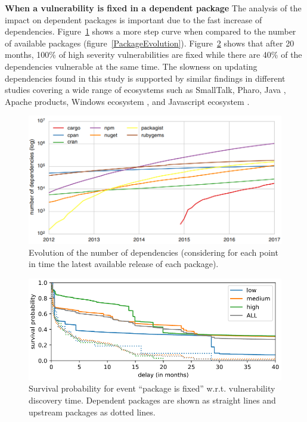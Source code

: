 \documentclass[pdf,bookmarks,colorlinks=true]{IEEEtran}
\begin{document}
\textbf{When a vulnerability is fixed in a dependent package}
The analysis of the impact on dependent packages is important due to the fast increase of dependencies. Figure~\ref{DependenciesGrowing} shows a more step curve when compared to the number of available packages (figure~\ref{PackageEvolution}). 
Figure~\ref{WhenIsFixedDependentPackages} shows that after 20 months, 100\% of high severity vulnerabilities are fixed while there are 40\% of the dependencies vulnerable at the same time. The slowness on updating dependencies found in this study is supported by similar findings in different studies covering a wide range of ecosystems such as SmallTalk\cite{Robbes:2012:DRA:2393596.2393662}, Pharo\cite{7332471}, Java \cite{7816485}, Apache products\cite{Bavota2015}, Windows ecosystem \cite{7163055}, and Javascript ecosystem \cite{Lauinger}.

\begin{figure}[h]
	\centering
	\includegraphics[scale=0.40]{DependenciesGrowing.png}
	\caption{Evolution of the number of dependencies (considering for each point in time the latest available
		release of each package).}
	\label{DependenciesGrowing}
\end{figure}

\begin{figure}[h]
	\centering
	\includegraphics[scale=0.40]{WhenIsFixedDependentPackages.png}
	\caption{Survival probability for event “package is fixed” w.r.t. vulnerability discovery time. Dependent packages are
		shown as straight lines and upstream packages as dotted lines.}
	\label{WhenIsFixedDependentPackages}
\end{figure}
\end{document}
